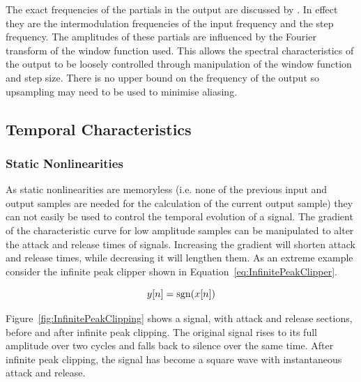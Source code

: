 			The exact frequencies of the partials in the output are discussed by \citet{kim2014shorttime}. In
			effect they are the intermodulation frequencies of the input frequency and the step frequency. The
			amplitudes of these partials are influenced by the Fourier transform of the window function used.
			This allows the spectral characteristics of the output to be loosely controlled through
			manipulation of the window function and step size. There is no upper bound on the frequency of the
			output so upsampling may need to be used to minimise aliasing.

	\subsection{Temporal Characteristics}
	\label{sec:ExcitationEvaluation-Comparison-TemporalCharacteristics}
		\subsubsection*{Static Nonlinearities}
			As static nonlinearities are memoryless (i.e. none of the previous input and output samples are
			needed for the calculation of the current output sample) they can not easily be used to control the
			temporal evolution of a signal. The gradient of the characteristic curve for low amplitude samples
			can be manipulated to alter the attack and release times of signals. Increasing the gradient will
			shorten attack and release times, while decreasing it will lengthen them. As an extreme example
			consider the infinite peak clipper shown in Equation~\ref{eq:InfinitePeakClipper}.

			\begin{equation}
				y[n] = \operatorname{sgn}(x[n])
				\label{eq:InfinitePeakClipper}
			\end{equation}
			
			Figure~\ref{fig:InfinitePeakClipping} shows a signal, with attack and release sections, before and
			after infinite peak clipping. The original signal rises to its full amplitude over two cycles and
			falls back to silence over the same time. After infinite peak clipping, the signal has become a
			square wave with instantaneous attack and release.


